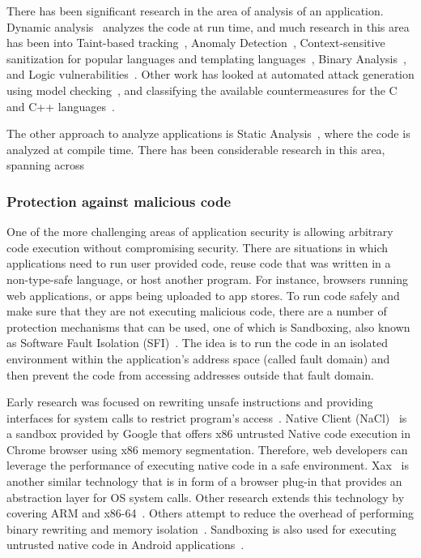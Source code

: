 \documentclass[11pt,letterpaper]{article}
\begin{document}
There has been significant research in the area of analysis of an application. Dynamic analysis~\cite{ball1999concept} analyzes the code at run time, and much research in this area has been into Taint-based tracking~\cite{chang2008}, Anomaly Detection~\cite{cova2007, li11:block, li2012}, Context-sensitive sanitization for popular languages and templating languages~\cite{saxena2011, samuel2011}, Binary Analysis~\cite{song2008}, and Logic vulnerabilities~\cite{felmetsger2010}. Other work has looked at automated attack generation using model checking~\cite{martin08:goal_directed_mc}, and classifying the available countermeasures for the C and C++ languages~\cite{younan2012}.

The other approach to analyze applications is Static Analysis~\cite{cousot1977abstract}, where the code is analyzed at compile time. There has been considerable research in this area, spanning across

\subsubsection{Protection against malicious code}
One of the more challenging areas of application security is allowing arbitrary code execution without compromising security. There are situations in which applications need to run user provided code, reuse code that was written in a non-type-safe language, or host another program. For instance, browsers running web applications, or apps being uploaded to app stores. To run code safely and make sure that they are not executing malicious code, there are a number of protection mechanisms that can be used, one of which is Sandboxing, also known as Software Fault Isolation (SFI)~\cite{wahbe1993}. The idea is to run the code in an isolated environment within the application's address space (called fault domain) and then prevent the code from accessing addresses outside that fault domain.

Early research was focused on rewriting unsafe instructions and providing interfaces for system calls to restrict program's access~\cite{wahbe1993, mccamant2006}. Native Client (NaCl)~\cite{yee2009} is a sandbox provided by Google that offers x86 untrusted Native code execution in Chrome browser using x86 memory segmentation. Therefore, web developers can leverage the performance of executing native code in a safe environment. Xax~\cite{douceur2008} is another similar technology that is in form of a browser plug-in that provides an abstraction layer for OS system calls. Other research extends this technology by covering ARM and x86-64~\cite{zhao2011, sehr2010, ansel}. Others attempt to reduce the overhead of performing binary rewriting and memory isolation~\cite{ford2008, jana2011}. Sandboxing is also used for executing untrusted native code in Android applications~\cite{sun2014, afonso2016}.
\end{document}
